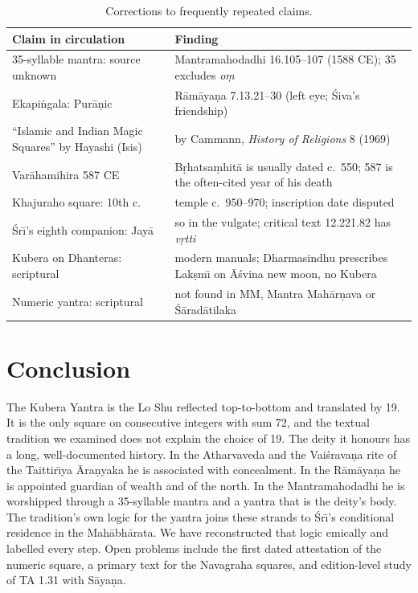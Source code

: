 \documentclass[journal]{IEEEtran}
\theoremstyle{definition}
\begin{document}
\begin{table}[t]
\caption{Corrections to frequently repeated claims.}
\label{tab:corrections}
\centering\footnotesize
\setlength{\tabcolsep}{2pt}
\begin{tabular}{@{}p{}p{}@{}}
\toprule
Claim in circulation & Finding\\
\midrule
35-syllable mantra: source unknown & Mantramahodadhi 16.105--107 (1588 CE); 35 excludes \emph{o\d m}\\
Ekapi\.ngala: Pur\=a\d nic & R\=am\=aya\d na 7.13.21--30 (left eye; \'Siva's friendship)\\
``Islamic and Indian Magic Squares'' by Hayashi (Isis) & by Cammann, \emph{History of Religions} 8 (1969)\\
Var\=ahamihira 587 CE & B\d rhatsa\d mhit\=a is usually dated c.\ 550; 587 is the often-cited year of his death\\
Khajuraho square: 10th c. & temple c.\ 950--970; inscription date disputed\\
\'Sr\=\i{}'s eighth companion: Jay\=a & so in the vulgate; critical text 12.221.82 has \emph{v\d rtti}\\
Kubera on Dhanteras: scriptural & modern manuals; Dharmasindhu prescribes Lak\d sm\=\i{} on \=A\'svina new moon, no Kubera\\
Numeric yantra: scriptural & not found in MM, Mantra Mah\=ar\d nava or \'S\=arad\=atilaka\\
\bottomrule
\end{tabular}
\end{table}

\section{Conclusion}
The Kubera Yantra is the Lo Shu reflected top-to-bottom and translated by 19. It is the only square on consecutive integers with sum 72, and the textual tradition we examined does not explain the choice of 19. The deity it honours has a long, well-documented history. In the Atharvaveda and the Vai\'srava\d na rite of the Taittir\=\i ya \=Ara\d nyaka he is associated with concealment. In the R\=am\=aya\d na he is appointed guardian of wealth and of the north. In the Mantramahodadhi he is worshipped through a 35-syllable mantra and a yantra that is the deity's body. The tradition's own logic for the yantra joins these strands to \'Sr\=\i's conditional residence in the Mah\=abh\=arata. We have reconstructed that logic emically and labelled every step. Open problems include the first dated attestation of the numeric square, a primary text for the Navagraha squares, and edition-level study of TA 1.31 with S\=aya\d na.
\end{document}
